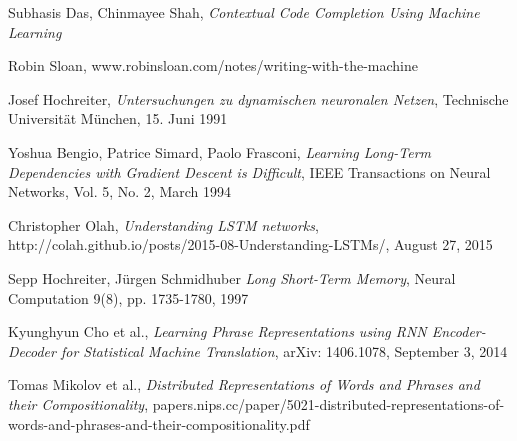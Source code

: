 \begin{thebibliography}{9}

    Subhasis Das, Chinmayee Shah,
    \textit{Contextual Code Completion Using Machine Learning}

     Robin Sloan,
     www.robinsloan.com/notes/writing-with-the-machine

     Josef Hochreiter,
     \textit{Untersuchungen zu dynamischen neuronalen Netzen},
     Technische Universität München,
     15. Juni 1991

     Yoshua Bengio, Patrice Simard, Paolo Frasconi,
     \textit{Learning Long-Term Dependencies with Gradient Descent is Difficult},
     IEEE Transactions on Neural Networks,
     Vol. 5, No. 2, March 1994

     Christopher Olah,
     \textit{Understanding LSTM networks},
     http://colah.github.io/posts/2015-08-Understanding-LSTMs/,
     August 27, 2015

     Sepp Hochreiter, Jürgen Schmidhuber
    \textit{Long Short-Term Memory},
     Neural Computation 9(8), pp. 1735-1780, 1997

	Kyunghyun Cho et al.,
	\textit{Learning Phrase Representations using RNN Encoder-Decoder for Statistical Machine Translation},
	arXiv: 1406.1078,
	September 3, 2014

    Tomas Mikolov et al.,
	\textit{Distributed Representations of Words and Phrases and their Compositionality},
	papers.nips.cc/paper/5021-distributed-representations-of-words-and-phrases-and-their-compositionality.pdf

\end{thebibliography}
